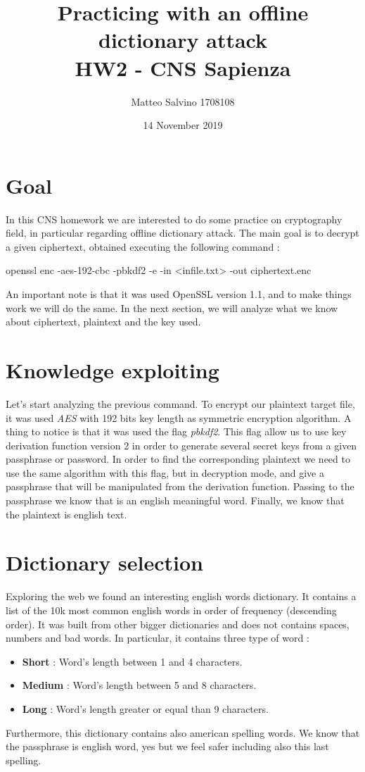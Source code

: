 \documentclass[11pt]{article}
\title{Practicing with an offline dictionary attack \\\large HW2 - CNS Sapienza}
\author{Matteo Salvino 1708108}
\date{14 November 2019}
\begin{document}
\maketitle

\section{Goal}
In this CNS homework we are interested to do some practice on cryptography field, in particular regarding offline dictionary attack. The main goal is to decrypt a given ciphertext, obtained executing the following command : 
\begin{center}
openssl enc -aes-192-cbc -pbkdf2 -e -in <infile.txt> -out ciphertext.enc
\end{center}
An important note is that it was used OpenSSL version 1.1, and to make things work we will do the same. In the next section, we will analyze what we know about ciphertext, plaintext and the key used.
\section{Knowledge exploiting}
Let's start analyzing the previous command. To encrypt our plaintext target file, it was used \textit{AES} with 192 bits key length as symmetric encryption algorithm. A thing to notice is that it was used the flag \textit{pbkdf2}. This flag allow us to use key derivation function version 2 in order to generate several secret keys from a given passphrase or password. In order to find the corresponding plaintext we need to use the same algorithm with this flag, but in decryption mode, and give a passphrase that will be manipulated from the derivation function. Passing to the passphrase we know that is an english meaningful word. Finally, we know that the plaintext is english text.
\section{Dictionary selection}
Exploring the web we found an interesting english words dictionary. It contains a list of the 10k most common english words in order of frequency (descending order). It was built from other bigger dictionaries and does not contains spaces, numbers and bad words. In particular, it contains three type of word :
\begin{itemize}
\item \textbf{Short} : Word's length between 1 and 4 characters.
\item \textbf{Medium} : Word's length between 5 and 8 characters.
\item \textbf{Long} : Word's length greater or equal than 9 characters.
\end{itemize}
Furthermore, this dictionary contains also american spelling words. We know that the passphrase is english word, yes but we feel safer including also this last spelling.
\end{document}
